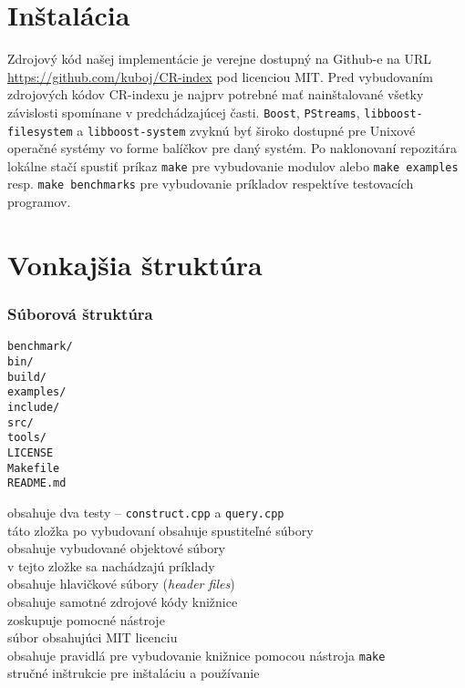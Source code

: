 \section{Inštalácia}
Zdrojový kód našej implementácie je verejne dostupný na Github-e na URL \url{https://github.com/kuboj/CR-index} pod licenciou MIT. Pred vybudovaním zdrojových kódov CR-indexu je najprv potrebné mať nainštalované všetky závislosti spomínane v predchádzajúcej časti. \texttt{Boost}, \texttt{PStreams}, \texttt{libboost-filesystem} a \texttt{libboost-system} zvyknú byť široko dostupné pre Unixové operačné systémy vo forme balíčkov pre daný systém. Po naklonovaní repozitára lokálne stačí spustiť príkaz \texttt{make} pre vybudovanie modulov alebo \texttt{make examples} resp. \texttt{make benchmarks} pre vybudovanie príkladov respektíve testovacích programov.

\section{Vonkajšia štruktúra}

\subsubsection{Súborová štruktúra}

\begin{minipage}[t]{0.20\linewidth}
    \vspace{0pt}
    \texttt{benchmark/} \\
    \texttt{bin/} \\
    \texttt{build/} \\
    \texttt{examples/}  \\
    \texttt{include/}   \\
    \texttt{src/}       \\
    \texttt{tools/}     \\
    \texttt{LICENSE}     \\
    \texttt{Makefile}     \\
    \texttt{README.md}
\end{minipage}
\hspace{0.3cm}
\begin{minipage}[t]{0.8\linewidth}
    \vspace{0pt}
    obsahuje dva testy -- \texttt{construct.cpp} a \texttt{query.cpp} \\
    táto zložka po vybudovaní obsahuje spustiteľné súbory \\
    obsahuje vybudované objektové súbory \\
    v tejto zložke sa nachádzajú príklady \\
    obsahuje hlavičkové súbory (\emph{header files}) \\
    obsahuje samotné zdrojové kódy knižnice \\
    zoskupuje pomocné nástroje \\
    súbor obsahujúci MIT licenciu \\
    obsahuje pravidlá pre vybudovanie knižnice pomocou nástroja \texttt{make} \\
    stručné inštrukcie pre inštaláciu a používanie
\end{minipage}

